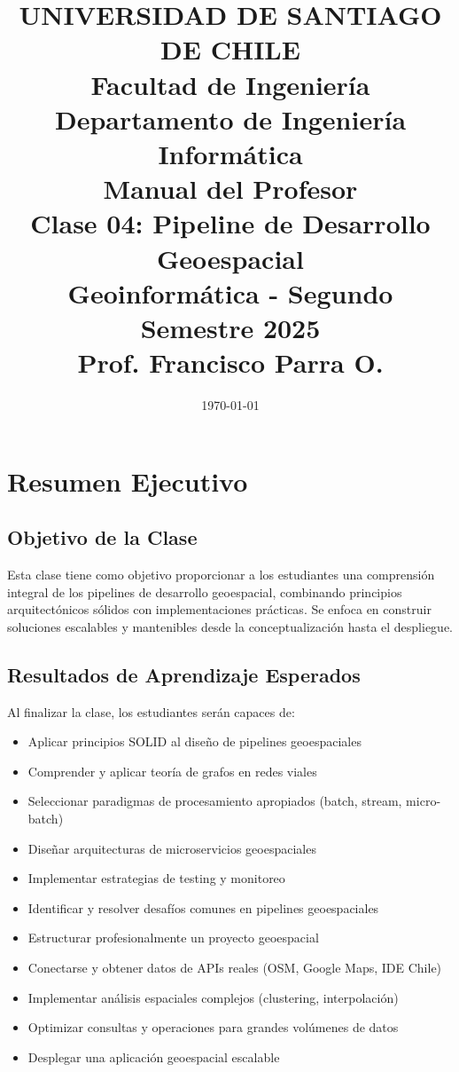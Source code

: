 \documentclass[11pt,a4paper]{article}
\title{
    \vspace{-2cm}
    \Large \textbf{UNIVERSIDAD DE SANTIAGO DE CHILE} \\
    \large Facultad de Ingeniería \\
    Departamento de Ingeniería Informática \\
    \vspace{1cm}
    \Huge \textbf{Manual del Profesor} \\
    \Large Clase 04: Pipeline de Desarrollo Geoespacial \\
    \vspace{1cm}
    \large Geoinformática - Segundo Semestre 2025 \\
    \vspace{0.5cm}
    \normalsize Prof. Francisco Parra O.
}
\date{\today}
\begin{document}
\maketitle
\thispagestyle{empty}
\newpage

\tableofcontents
\newpage

\section{Resumen Ejecutivo}

\subsection{Objetivo de la Clase}
Esta clase tiene como objetivo proporcionar a los estudiantes una comprensión integral de los pipelines de desarrollo geoespacial, combinando principios arquitectónicos sólidos con implementaciones prácticas. Se enfoca en construir soluciones escalables y mantenibles desde la conceptualización hasta el despliegue.

\subsection{Resultados de Aprendizaje Esperados}
Al finalizar la clase, los estudiantes serán capaces de:
\begin{itemize}
    \item Aplicar principios SOLID al diseño de pipelines geoespaciales
    \item Comprender y aplicar teoría de grafos en redes viales
    \item Seleccionar paradigmas de procesamiento apropiados (batch, stream, micro-batch)
    \item Diseñar arquitecturas de microservicios geoespaciales
    \item Implementar estrategias de testing y monitoreo
    \item Identificar y resolver desafíos comunes en pipelines geoespaciales
    \item Estructurar profesionalmente un proyecto geoespacial
    \item Conectarse y obtener datos de APIs reales (OSM, Google Maps, IDE Chile)
    \item Implementar análisis espaciales complejos (clustering, interpolación)
    \item Optimizar consultas y operaciones para grandes volúmenes de datos
    \item Desplegar una aplicación geoespacial escalable
\end{itemize}
\end{document}
